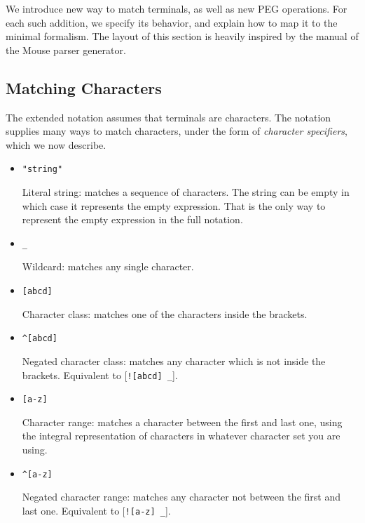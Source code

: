 We introduce new way to match terminals, as well as new PEG operations. For each
such addition, we specify its behavior, and explain how to map it to the minimal
formalism. The layout of this section is heavily inspired by the manual of the
Mouse parser generator. \cite{mouse_man}

\subsection{Matching Characters}

The extended notation assumes that terminals are characters. The notation
supplies many ways to match characters, under the form of \emph{character
  specifiers}, which we now describe.

\begin{itemize}

\item \verb|"string"|

  Literal string: matches a sequence of characters. The string can be empty in
  which case it represents the empty expression. That is the only way to
  represent the empty expression in the full notation.

\item \verb|_|

  Wildcard: matches any single character.

\item \verb|[abcd]|

  Character class: matches one of the characters inside the brackets.

\item \verb|^[abcd]|

  Negated character class: matches any character which is not inside the
  brackets. Equivalent to [\lstinline{![abcd] _}].

\item \verb|[a-z]|

  Character range: matches a character between the first and last one, using the
  integral representation of characters in whatever character set you are using.

\item \verb|^[a-z]|

  Negated character range: matches any character not between the first and last
  one. Equivalent to [\lstinline{![a-z] _}].

\end{itemize}

